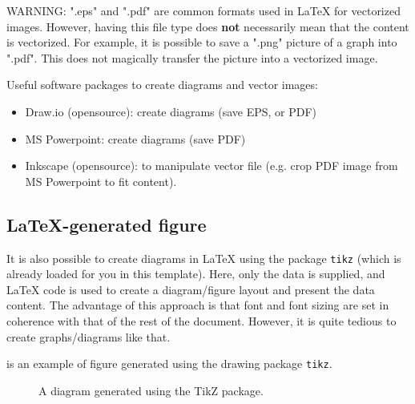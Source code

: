 WARNING: ".eps" and ".pdf" are common formats used in LaTeX for vectorized images. However, having this file type does \textbf{not} necessarily mean that the content is vectorized.
For example, it is possible to save a ".png" picture of a graph into ".pdf". 
This does not magically transfer the picture into a vectorized image.

Useful software packages to create diagrams and vector images:
\begin{itemize}
    \item Draw.io (opensource): create diagrams (save EPS, or PDF)
    \item MS Powerpoint: create diagrams (save PDF)
    \item Inkscape (opensource): to manipulate vector file (e.g. crop PDF image from MS Powerpoint to fit content).
\end{itemize}


\subsection{LaTeX-generated figure}
\label{sec:LaTeXFigure}

It is also possible to create diagrams in LaTeX using the package \verb|tikz| (which is already loaded for you in this template).
Here, only the data is supplied, and LaTeX code is used to create a diagram/figure layout and present the data content.
The advantage of this approach is that font and font sizing are set in coherence with that of the rest of the document.
However, it is quite tedious to create graphs/diagrams like that.

 is an example of figure generated using the drawing package \verb|tikz|.

\begin{figure}
 \centering
 \caption{A diagram generated using the TikZ package.}
 \label{fig:tikz}
\end{figure}


